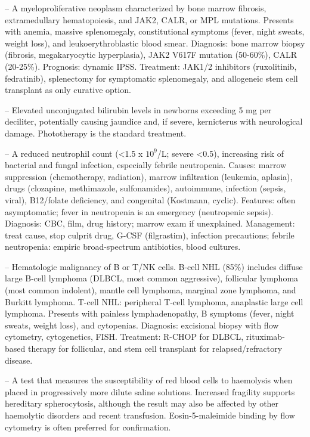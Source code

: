 -- A myeloproliferative neoplasm characterized by bone marrow fibrosis, extramedullary hematopoiesis, and JAK2, CALR, or MPL mutations. Presents with anemia, massive splenomegaly, constitutional symptoms (fever, night sweats, weight loss), and leukoerythroblastic blood smear. Diagnosis: bone marrow biopsy (fibrosis, megakaryocytic hyperplasia), JAK2 V617F mutation (50-60\%), CALR (20-25\%). Prognosis: dynamic IPSS. Treatment: JAK1/2 inhibitors (ruxolitinib, fedratinib), splenectomy for symptomatic splenomegaly, and allogeneic stem cell transplant as only curative option.

-- Elevated unconjugated bilirubin levels in newborns exceeding 5 mg per deciliter, potentially causing jaundice and, if severe, kernicterus with neurological damage. Phototherapy is the standard treatment.

-- A reduced neutrophil count (<1.5 x $10^9$/L; severe <0.5), increasing risk of bacterial and fungal infection, especially febrile neutropenia. Causes: marrow suppression (chemotherapy, radiation), marrow infiltration (leukemia, aplasia), drugs (clozapine, methimazole, sulfonamides), autoimmune, infection (sepsis, viral), B12/folate deficiency, and congenital (Kostmann, cyclic). Features: often asymptomatic; fever in neutropenia is an emergency (neutropenic sepsis). Diagnosis: CBC, film, drug history; marrow exam if unexplained. Management: treat cause, stop culprit drug, G-CSF (filgrastim), infection precautions; febrile neutropenia: empiric broad-spectrum antibiotics, blood cultures.

-- Hematologic malignancy of B or T/NK cells. B-cell NHL (85\%) includes diffuse large B-cell lymphoma (DLBCL, most common aggressive), follicular lymphoma (most common indolent), mantle cell lymphoma, marginal zone lymphoma, and Burkitt lymphoma. T-cell NHL: peripheral T-cell lymphoma, anaplastic large cell lymphoma. Presents with painless lymphadenopathy, B symptoms (fever, night sweats, weight loss), and cytopenias. Diagnosis: excisional biopsy with flow cytometry, cytogenetics, FISH. Treatment: R-CHOP for DLBCL, rituximab-based therapy for follicular, and stem cell transplant for relapsed/refractory disease.

-- A test that measures the susceptibility of red blood cells to haemolysis when placed in progressively more dilute saline solutions. Increased fragility supports hereditary spherocytosis, although the result may also be affected by other haemolytic disorders and recent transfusion. Eosin-5-maleimide binding by flow cytometry is often preferred for confirmation.

